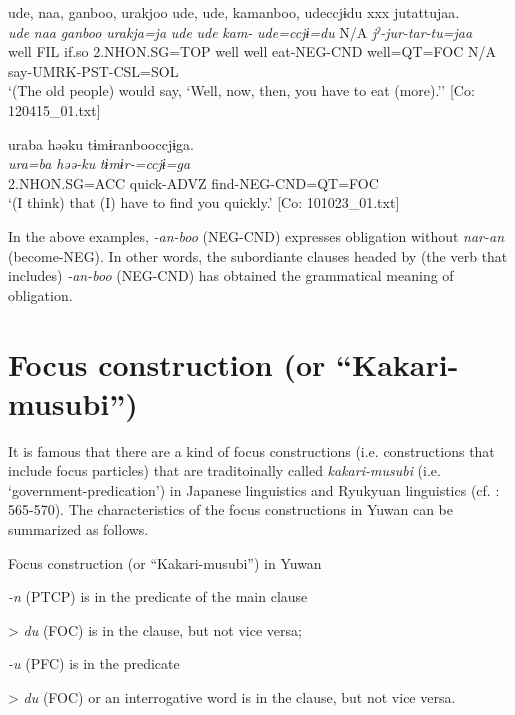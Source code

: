   \ex\relax[= (4-57)]

    
      \glll    ude,  naa,  ganboo,  urakjoo  ude,  ude,  kamanboo, udeccjɨdu  xxx  jutattujaa.\\
      \textit{ude}  \textit{naa}  \textit{ganboo}  \textit{urakja=ja}  \textit{ude}  \textit{ude}  \textit{kam-} \textit{ude=ccjɨ=du}  N/A  \textit{jˀ-jur-tar-tu=jaa}\\
      well  FIL  if.so  2.NHON.SG=TOP  well  well  eat-NEG-CND  well=QT=FOC  N/A  say-UMRK-PST-CSL=SOL\\
    \glt       ‘(The old people) would say, ‘Well, now, then, you have to eat (more).’’ [Co: 120415\_01.txt]

  \ex  
      \glll    uraba  həəku  tɨmɨranbooccjɨga.\\
      \textit{ura=ba}  \textit{həə-ku}  \textit{tɨmɨr-=ccjɨ=ga}\\
      2.NHON.SG=ACC  quick-ADVZ  find-NEG-CND=QT=FOC\\
      \glt       ‘(I think) that (I) have to find you quickly.’ [Co: 101023\_01.txt]
\z
\z

In the above examples, \textit{{}-an-boo} (NEG-CND) expresses obligation without \textit{nar-an} (become-NEG). In other words, the subordiante clauses headed by (the verb that includes) \textit{{}-an-boo} (NEG-CND) has obtained the grammatical meaning of obligation.

\section{Focus construction (or “Kakari-musubi”)}\label{sec:11.3}

It is famous that there are a kind of focus constructions (i.e. constructions that include focus particles) that are traditoinally called \textit{kakari-musubi} (i.e. ‘government-predication’) in Japanese linguistics and Ryukyuan linguistics (cf. \citealt{Shimoji2008}: 565-570). The characteristics of the focus constructions in Yuwan can be summarized as follows.

\ea\label{ex:11-14}   Focus construction (or “Kakari-musubi”) in Yuwan

\ea   \textit{{}-n} (PTCP) is in the predicate of the main clause

> \textit{du} (FOC) is in the clause, but not vice versa;

\ex   \textit{{}-u} (PFC) is in the predicate

> \textit{du} (FOC) or an interrogative word is in the clause, but not vice versa.
\z
\z

